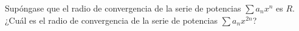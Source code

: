\item Supóngase que el radio de convergencia de la serie de potencias $\sum a_n x^n$ es $R$. ¿Cuál es el radio de convergencia de la serie de potencias $\sum a_n x^{2n}$?
